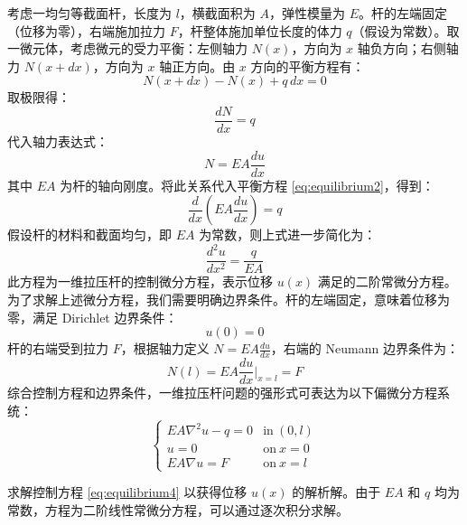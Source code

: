 \documentclass[engineeringmaster]{hquThesis}
\begin{document}
考虑一均匀等截面杆，长度为 \( l \)，横截面积为 \( A \)，弹性模量为 \( E \)。杆的左端固定（位移为零），右端施加拉力 \( F \)，杆整体施加单位长度的体力 \( q \)（假设为常数）。取一微元体，考虑微元的受力平衡：左侧轴力 \( N(x) \)，方向为 \( x \) 轴负方向；右侧轴力 \( N(x + dx) \)，方向为 \( x \) 轴正方向。由 \( x \) 方向的平衡方程有：
\begin{equation}
    N(x + dx) - N(x) + q \, dx = 0
    \label{eq:equilibrium1}
    \end{equation}
取极限得：
\begin{equation}
    \frac{dN}{dx} = q
    \label{eq:equilibrium2}
\end{equation}
代入轴力表达式：
\begin{equation}
    N = EA \frac{du}{dx}
    \label{eq:axial_force}
\end{equation}
其中 \( EA \) 为杆的轴向刚度。将此关系代入平衡方程 \eqref{eq:equilibrium2}，得到：
\begin{equation}
    \frac{d}{dx} \left( EA \frac{du}{dx} \right) = q
    \label{eq:equilibrium3}
\end{equation}
假设杆的材料和截面均匀，即 \( EA \) 为常数，则上式进一步简化为：
\begin{equation}
    \frac{d^2 u}{dx^2} = \frac{q}{EA}
    \label{eq:equilibrium4}
\end{equation}
此方程为一维拉压杆的控制微分方程，表示位移 \( u(x) \) 满足的二阶常微分方程。
为了求解上述微分方程，我们需要明确边界条件。杆的左端固定，意味着位移为零，满足 Dirichlet 边界条件：
\begin{equation}
    u(0) = 0
    \label{eq:bc_left}
\end{equation}
杆的右端受到拉力 \( F \)，根据轴力定义 \( N = EA \frac{du}{dx} \)，右端的 Neumann 边界条件为：
\begin{equation}
    N(l) = EA \frac{du}{dx} \bigg|_{x=l} = F
    \label{eq:bc_right}
\end{equation}
综合控制方程和边界条件，一维拉压杆问题的强形式可表达为以下偏微分方程系统：
\begin{equation}
    \left\{
    \begin{array}{ll}
    EA \nabla^2 u - q = 0 & \mathrm{in~} (0, l) \\
    u = 0 & \mathrm{on~} x = 0 \\
    EA \nabla u = F & \mathrm{on~} x = l
    \end{array}
    \right.
    \label{eq:strong_form_system}
\end{equation}

求解控制方程 \eqref{eq:equilibrium4} 以获得位移 \( u(x) \) 的解析解。由于 \( EA \) 和 \( q \) 均为常数，方程为二阶线性常微分方程，可以通过逐次积分求解。
\end{document}

